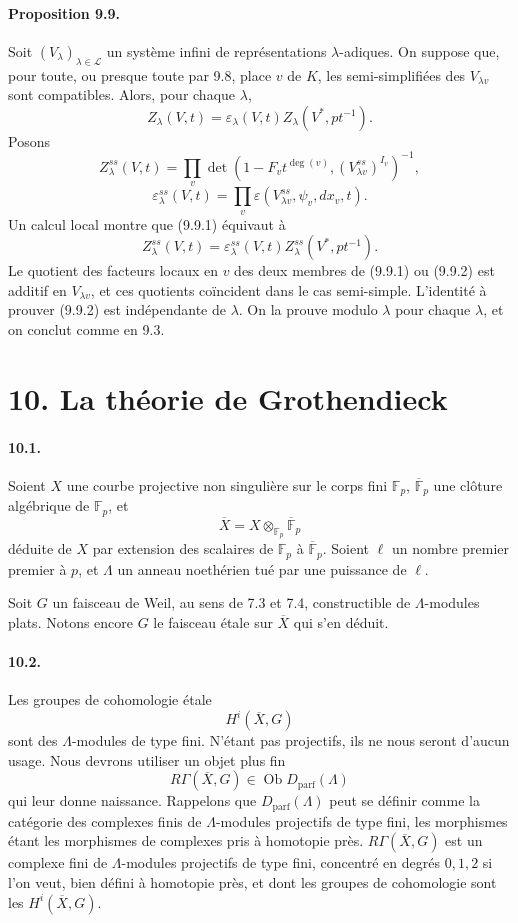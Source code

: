 \documentclass[10pt]{article}
\newcommand{\F}{\mathbb F}
\providecommand{\LLL}{\mathcal L}
\providecommand{\Dparf}{D_{\mathrm{parf}}}
\begin{document}
\paragraph{Proposition 9.9.} Soit $(V_\lambda)_{\lambda\in\LLL}$ un système infini de représentations $\lambda$-adiques. On suppose que, pour toute, ou presque toute par 9.8, place $v$ de $K$, les semi-simplifiées des $V_{\lambda v}$ sont compatibles. Alors, pour chaque $\lambda$,
\[
\tag{9.9.1}
Z_\lambda(V,t)=\varepsilon_\lambda(V,t)Z_\lambda(V^*,pt^{-1}).
\]
Posons
\[
Z_\lambda^{ss}(V,t)=
\prod_v\det(1-F_vt^{\deg(v)},(V_{\lambda v}^{ss})^{I_v})^{-1},
\]
\[
\varepsilon_\lambda^{ss}(V,t)=
\prod_v\varepsilon(V_{\lambda v}^{ss},\psi_v,dx_v,t).
\]
Un calcul local montre que (9.9.1) équivaut à
\[
\tag{9.9.2}
Z_\lambda^{ss}(V,t)=
\varepsilon_\lambda^{ss}(V,t)Z_\lambda^{ss}(V^*,pt^{-1}).
\]
Le quotient des facteurs locaux en $v$ des deux membres de (9.9.1) ou (9.9.2) est additif en $V_{\lambda v}$, et ces quotients coïncident dans le cas semi-simple. L'identité à prouver (9.9.2) est indépendante de $\lambda$. On la prouve modulo $\lambda$ pour chaque $\lambda$, et on conclut comme en 9.3.




\section*{10. La théorie de Grothendieck}

\paragraph{10.1.} Soient \(X\) une courbe projective non singulière sur le corps fini \(\F_p\), \(\overline{\F}_p\) une clôture algébrique de \(\F_p\), et
\[
\overline X=X\otimes_{\F_p}\overline{\F}_p
\]
déduite de \(X\) par extension des scalaires de \(\F_p\) à \(\overline{\F}_p\). Soient \(\ell\) un nombre premier premier à \(p\), et \(\Lambda\) un anneau noethérien tué par une puissance de \(\ell\).

Soit \(G\) un faisceau de Weil, au sens de 7.3 et 7.4, constructible de \(\Lambda\)-modules plats. Notons encore \(G\) le faisceau étale sur \(\overline X\) qui s'en déduit.

\paragraph{10.2.} Les groupes de cohomologie étale
\[
H^i(\overline X,G)
\]
sont des \(\Lambda\)-modules de type fini. N'étant pas projectifs, ils ne nous seront d'aucun usage. Nous devrons utiliser un objet plus fin
\[
R\Gamma(\overline X,G)\in\operatorname{Ob}\Dparf(\Lambda)
\]
qui leur donne naissance. Rappelons que \(\Dparf(\Lambda)\) peut se définir comme la catégorie des complexes finis de \(\Lambda\)-modules projectifs de type fini, les morphismes étant les morphismes de complexes pris à homotopie près. \(R\Gamma(\overline X,G)\) est un complexe fini de \(\Lambda\)-modules projectifs de type fini, concentré en degrés \(0,1,2\) si l'on veut, bien défini à homotopie près, et dont les groupes de cohomologie sont les \(H^i(\overline X,G)\).
\end{document}
